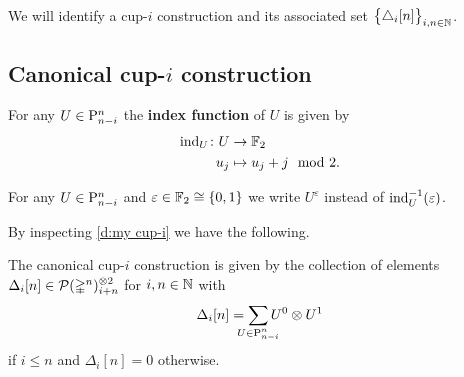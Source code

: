 We will identify a \mbox{cup-$i$} construction and its associated set $\big\{ \triangle_i [n] \big\}_{i,n \in \mathbb{N}}$.

\subsection{Canonical \mbox{cup-$i$} construction}

\begin{definition}
	For any $U \in \mathrm{P}^n_{n-i}$ the \textbf{index function} of $U$ is given by
	\[
	\begin{split}
	\operatorname{ind}_U \colon U &\to {\mathbb{F}_2} \\
	u_j &\mapsto u_j + j \mod 2.
	\end{split}
	\]
\end{definition}

\begin{notation*}
	For any $U \in \mathrm{P}^n_{n-i}$ and $\varepsilon \in {\mathbb{F}_2} \cong \{0,1\}$ we write $U^\varepsilon$ instead of $\operatorname{ind}_U^{-1}(\varepsilon)$.
\end{notation*}

By inspecting \cref{d:my cup-i} we have the following.

\begin{lemma} \label{l:canonical}
	The canonical \mbox{cup-$i$} construction is given by the collection of elements $\Delta_i[n] \in \mathcal{P}(\mathbb{\Delta}^n)^{\otimes 2}_{i+n}$ for $i,n \in \mathbb{N}$ with
	\[
	\Delta_i[n] =
	\sum_{\mathclap{U \in \rP^n_{n-i}}} U^0 \ot U^1
	\]
	if $i \leq n$ and $\Delta_i[n] = 0$ otherwise.
\end{lemma}